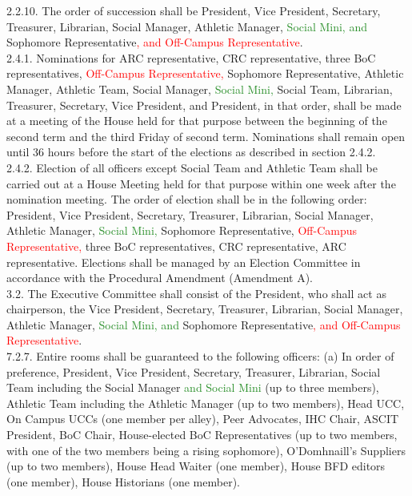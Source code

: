 \documentclass[10pt]{article} %
\begin{document}
\begin{itemize}
	2.2.10. The order of succession shall be President, Vice President, Secretary, Treasurer, Librarian, Social Manager, Athletic Manager, \textcolor{ForestGreen}{Social Mini, and} Sophomore Representative\textcolor{red}{, and Off-Campus Representative}. \\
	2.4.1. Nominations for ARC representative, CRC representative, three BoC representatives, \textcolor{red}{Off-Campus Representative,} Sophomore Representative, Athletic Manager, Athletic Team, Social Manager, \textcolor{ForestGreen}{Social Mini,} Social Team, Librarian, Treasurer, Secretary, Vice President, and President, in that order, shall be made at a meeting of the House held for that purpose between the beginning of the second term and the third Friday of second term. Nominations shall remain open until 36 hours before the start of the elections as described in section 2.4.2. \\
	2.4.2. Election of all officers except Social Team and Athletic Team shall be carried out at a House Meeting held for that purpose within one week after the nomination meeting. The order of election shall be in the following order: President, Vice President, Secretary, Treasurer, Librarian, Social Manager, Athletic Manager, \textcolor{ForestGreen}{Social Mini,} Sophomore Representative, \textcolor{red}{Off-Campus Representative,} three BoC representatives, CRC representative, ARC representative. Elections shall be managed by an Election Committee in accordance with the Procedural Amendment (Amendment A). \\
	3.2. The Executive Committee shall consist of the President, who shall act as chairperson, the Vice President, Secretary, Treasurer, Librarian, Social Manager, Athletic Manager, \textcolor{ForestGreen}{Social Mini, and} Sophomore Representative\textcolor{red}{, and Off-Campus Representative}. \\
	7.2.7. Entire rooms shall be guaranteed to the following officers: (a) In order of preference, President, Vice President, Secretary, Treasurer, Librarian, Social Team including the Social Manager \textcolor{ForestGreen}{and Social Mini} (up to three members), Athletic Team including the Athletic Manager (up to two members), Head UCC, On Campus UCCs (one member per alley), Peer Advocates, IHC Chair, ASCIT President, BoC Chair, House-elected BoC Representatives (up to two members, with one of the two members being a rising sophomore), O’Domhnaill’s Suppliers (up to two members), House Head Waiter (one member), House BFD editors (one member), House Historians (one member). \\

\end{itemize}
\end{document}
